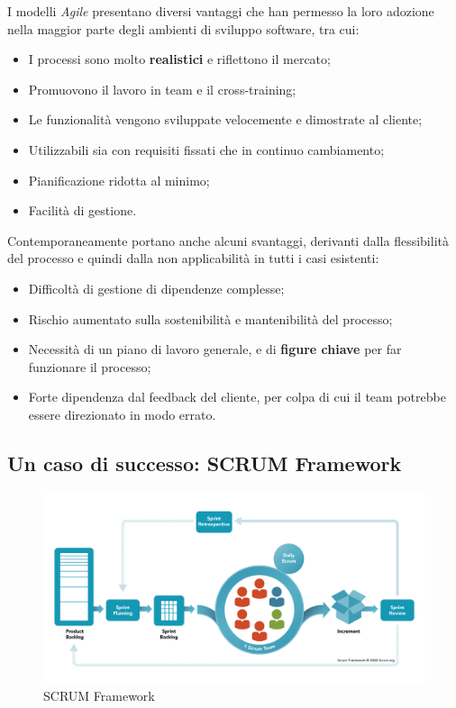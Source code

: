 \documentclass[a4paper,12pt]{report}
\begin{document}
				I modelli \emph{Agile} presentano diversi vantaggi che han permesso la loro adozione nella maggior parte degli ambienti di sviluppo software, tra cui:
				\begin{itemize}
					\item I processi sono molto \textbf{realistici} e riflettono il mercato;
					\item Promuovono il lavoro in team e il cross-training;
					\item Le funzionalità vengono sviluppate velocemente e dimostrate al cliente;
					\item Utilizzabili sia con requisiti fissati che in continuo cambiamento;
					\item Pianificazione ridotta al minimo;
					\item Facilità di gestione.
				\end{itemize}
			
				Contemporaneamente portano anche alcuni svantaggi, derivanti dalla flessibilità del processo e quindi dalla non applicabilità in tutti i casi esistenti:
				\begin{itemize}
					\item Difficoltà di gestione di dipendenze complesse;
					\item Rischio aumentato sulla sostenibilità e mantenibilità del processo;
					\item Necessità di un piano di lavoro generale, e di \textbf{figure chiave} per far funzionare il processo;
					\item Forte dipendenza dal feedback del cliente, per colpa di cui il team potrebbe essere direzionato in modo errato.
				\end{itemize}
	
			\subsection{Un caso di successo: SCRUM Framework}
			
				\begin{figure}[h]
					\centering
					\includegraphics[width=1\textwidth]{scrum}
					\caption{SCRUM Framework}
					\label{fig:scrum}
				\end{figure}
			
\end{document}

